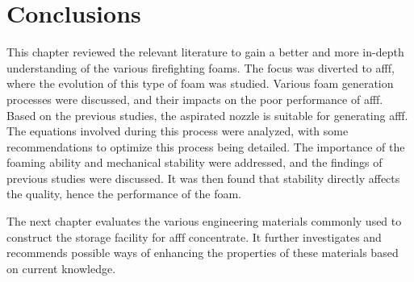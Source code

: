 \section{Conclusions}
This chapter reviewed the relevant literature to gain a better and more in-depth understanding of the various firefighting foams. The focus was diverted to \acrshort{afff}, where the evolution of this type of foam was studied. Various foam generation processes were discussed, and their impacts on the poor performance of \acrshort{afff}. Based on the previous studies, the aspirated nozzle is suitable for generating \acrshort{afff}. The equations involved during this process were analyzed, with some recommendations to optimize this process being detailed. The importance of the foaming ability and mechanical stability were addressed, and the findings of previous studies were discussed. It was then found that stability directly affects the quality, hence the performance of the foam.  

The next chapter evaluates the various engineering materials commonly used to construct the storage facility for \acrshort{afff} concentrate. It further investigates and recommends possible ways of enhancing the properties of these materials based on current knowledge. 
